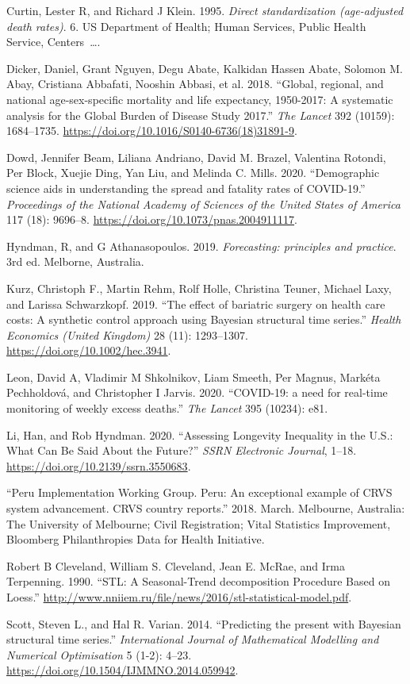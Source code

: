 \documentclass[
]{article}
\begin{document}
\leavevmode\hypertarget{ref-Curtin1995}{}%
Curtin, Lester R, and Richard J Klein. 1995. \emph{Direct standardization (age-adjusted death rates)}. 6. US Department of Health; Human Services, Public Health Service, Centers~\ldots.

\leavevmode\hypertarget{ref-Dicker2018}{}%
Dicker, Daniel, Grant Nguyen, Degu Abate, Kalkidan Hassen Abate, Solomon M. Abay, Cristiana Abbafati, Nooshin Abbasi, et al. 2018. ``Global, regional, and national age-sex-specific mortality and life expectancy, 1950-2017: A systematic analysis for the Global Burden of Disease Study 2017.'' \emph{The Lancet} 392 (10159): 1684--1735. \url{https://doi.org/10.1016/S0140-6736(18)31891-9}.

\leavevmode\hypertarget{ref-Dowd2020}{}%
Dowd, Jennifer Beam, Liliana Andriano, David M. Brazel, Valentina Rotondi, Per Block, Xuejie Ding, Yan Liu, and Melinda C. Mills. 2020. ``Demographic science aids in understanding the spread and fatality rates of COVID-19.'' \emph{Proceedings of the National Academy of Sciences of the United States of America} 117 (18): 9696--8. \url{https://doi.org/10.1073/pnas.2004911117}.

\leavevmode\hypertarget{ref-Hyndman2019}{}%
Hyndman, R, and G Athanasopoulos. 2019. \emph{Forecasting: principles and practice}. 3rd ed. Melborne, Australia.

\leavevmode\hypertarget{ref-Kurz2019}{}%
Kurz, Christoph F., Martin Rehm, Rolf Holle, Christina Teuner, Michael Laxy, and Larissa Schwarzkopf. 2019. ``The effect of bariatric surgery on health care costs: A synthetic control approach using Bayesian structural time series.'' \emph{Health Economics (United Kingdom)} 28 (11): 1293--1307. \url{https://doi.org/10.1002/hec.3941}.

\leavevmode\hypertarget{ref-Leon2020}{}%
Leon, David A, Vladimir M Shkolnikov, Liam Smeeth, Per Magnus, Markéta Pechholdová, and Christopher I Jarvis. 2020. ``COVID-19: a need for real-time monitoring of weekly excess deaths.'' \emph{The Lancet} 395 (10234): e81.

\leavevmode\hypertarget{ref-Li2020}{}%
Li, Han, and Rob Hyndman. 2020. ``Assessing Longevity Inequality in the U.S.: What Can Be Said About the Future?'' \emph{SSRN Electronic Journal}, 1--18. \url{https://doi.org/10.2139/ssrn.3550683}.

\leavevmode\hypertarget{ref-CRVS2018}{}%
``Peru Implementation Working Group. Peru: An exceptional example of CRVS system advancement. CRVS country reports.'' 2018. March. Melbourne, Australia: The University of Melbourne; Civil Registration; Vital Statistics Improvement, Bloomberg Philanthropies Data for Health Initiative.

\leavevmode\hypertarget{ref-RobertBCleveland1990}{}%
Robert B Cleveland, William S. Cleveland, Jean E. McRae, and Irma Terpenning. 1990. ``STL: A Seasonal-Trend decomposition Procedure Based on Loess.'' \url{http://www.nniiem.ru/file/news/2016/stl-statistical-model.pdf}.

\leavevmode\hypertarget{ref-Scott2014}{}%
Scott, Steven L., and Hal R. Varian. 2014. ``Predicting the present with Bayesian structural time series.'' \emph{International Journal of Mathematical Modelling and Numerical Optimisation} 5 (1-2): 4--23. \url{https://doi.org/10.1504/IJMMNO.2014.059942}.
\end{document}

